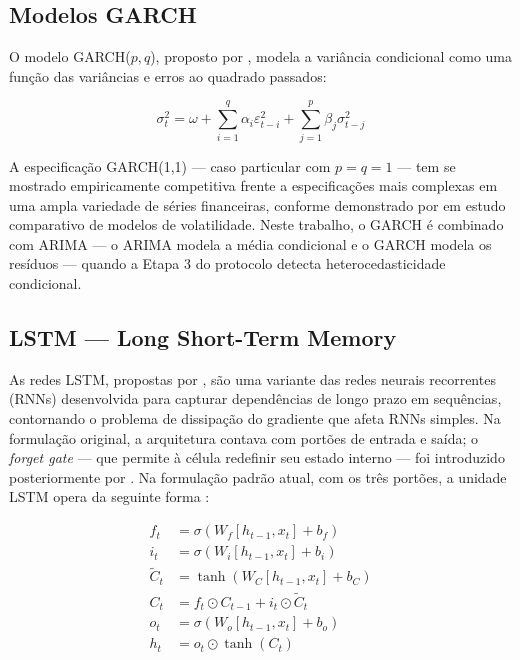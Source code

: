 \documentclass[
  12pt,
  openright,
  twoside,
  a4paper,
  english,
  brazil
]{abntex2}
\begin{document}
\subsection{Modelos GARCH}
\label{subsec:garch}

O modelo GARCH($p, q$), proposto por , modela a variância condicional como uma função das variâncias e erros ao quadrado passados:

\begin{equation}
  \sigma_t^2 = \omega + \sum_{i=1}^{q} \alpha_i \varepsilon_{t-i}^2 + \sum_{j=1}^{p} \beta_j \sigma_{t-j}^2
  \label{eq:garch}
\end{equation}

A especificação GARCH(1,1) — caso particular com $p = q = 1$ — tem se mostrado empiricamente competitiva frente a especificações mais complexas em uma ampla variedade de séries financeiras, conforme demonstrado por  em estudo comparativo de modelos de volatilidade. Neste trabalho, o GARCH é combinado com ARIMA — o ARIMA modela a média condicional e o GARCH modela os resíduos — quando a Etapa 3 do protocolo detecta heterocedasticidade condicional.

\subsection{LSTM — Long Short-Term Memory}
\label{subsec:lstm}

As redes LSTM, propostas por , são uma variante das redes neurais recorrentes (RNNs) desenvolvida para capturar dependências de longo prazo em sequências, contornando o problema de dissipação do gradiente que afeta RNNs simples. Na formulação original, a arquitetura contava com portões de entrada e saída; o \textit{forget gate} — que permite à célula redefinir seu estado interno — foi introduzido posteriormente por . Na formulação padrão atual, com os três portões, a unidade LSTM opera da seguinte forma \cite{hochreiter1997long,gers2000learning}:

\begin{align}
  f_t &= \sigma(W_f [h_{t-1}, x_t] + b_f) \label{eq:lstm-forget} \\
  i_t &= \sigma(W_i [h_{t-1}, x_t] + b_i) \label{eq:lstm-input} \\
  \tilde{C}_t &= \tanh(W_C [h_{t-1}, x_t] + b_C) \label{eq:lstm-cell-candidate} \\
  C_t &= f_t \odot C_{t-1} + i_t \odot \tilde{C}_t \label{eq:lstm-cell} \\
  o_t &= \sigma(W_o [h_{t-1}, x_t] + b_o) \label{eq:lstm-output} \\
  h_t &= o_t \odot \tanh(C_t) \label{eq:lstm-hidden}
\end{align}
\end{document}
